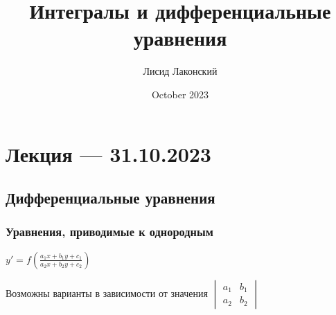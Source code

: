 \documentclass{article}
\title{Интегралы и дифференциальные уравнения}
\author{Лисид Лаконский}
\date{October 2023}
\begin{document}
\raggedright

\maketitle

\tableofcontents
\pagebreak

\section{Лекция — 31.10.2023}

\subsection{Дифференциальные уравнения}

\subsubsection{Уравнения, приводимые к однородным}

$y' = f(\frac{a_1 x + b_1 y + c_1}{a_2 x + b_2 y + c_2})$

Возможны варианты в зависимости от значения $\begin{vmatrix} a_1 & b_1 \\ a_2 & b_2 \end{vmatrix}$
\end{document}
